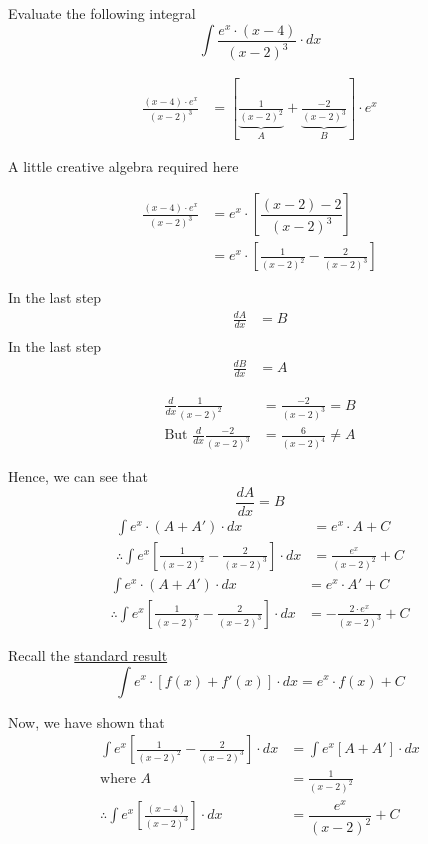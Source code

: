 \documentclass[12pt]{article}
\begin{document}
Evaluate the following integral 
\[ \int \dfrac{e^x\cdot (x-4)}{(x-2)^3}\cdot dx \]

\newcard 

\begin{align}
\frac{(x-4)\cdot e^x}{(x-2)^3} &= \left[\underbrace{\frac{1}{(x-2)^2}}_A+\underbrace{\frac{-2}{(x-2)^3}}_B\right]\cdot e^x 
\end{align}

\newcard 
A little creative algebra required here

\begin{align}
	\frac{(x-4)\cdot e^x}{(x-2)^3} &= e^x\cdot \left[ \dfrac{(x-2) - 2}{(x-2)^3}\right] \\
	&= e^x\cdot \left[ \frac{1}{(x-2)^2} - \frac{2}{(x-2)^3}\right]
\end{align}

\newcard 
In the last step
\begin{align}
	\frac{dA}{dx} &= B \\ 
\end{align}
\newcard 
In the last step 
\begin{align}
	\frac{dB}{dx} &= A 
\end{align}

\newcard 
\begin{align}
	\frac{d}{dx}\frac{1}{(x-2)^2} &= \frac{-2}{(x-2)^3} = B \\ 
	\text{But }\frac{d}{dx} \frac{-2}{(x-2)^3} &= \frac{6}{(x-2)^4} \neq A 
\end{align}

Hence, we can see that \[ \frac{dA}{dx} = B \]
\newcard 
\begin{align}
	\int e^x\cdot \left(A + A' \right)\cdot dx &= e^x\cdot A + C \\ 
	\therefore \int e^x \left[\frac{1}{(x-2)^2}-\frac{2}{(x-2)^3} \right]\cdot dx &= \frac{e^x}{(x-2)^2} + C 
\end{align}
\newcard 
\begin{align}
	\int e^x\cdot \left(A + A' \right)\cdot dx &= e^x\cdot A' + C \\ 
	\therefore \int e^x \left[\frac{1}{(x-2)^2}-\frac{2}{(x-2)^3} \right]\cdot dx &= -\frac{2\cdot e^x}{(x-2)^3} + C 
\end{align}

\newcard 
Recall the \underline{standard result}
\[ \int e^x\cdot \left[f(x) + f'(x) \right]\cdot dx = e^x\cdot f(x) + C\]

Now, we have shown that 
\begin{align}
	\int e^x \left[\frac{1}{(x-2)^2} - \frac{2}{(x-2)^3} \right]\cdot dx &= \int e^x \left[A + A' \right]\cdot dx \\
	\text{where } A &= \frac{1}{(x-2)^2} \\
	\therefore \int e^x \left[\frac{(x-4)}{(x-2)^3} \right]\cdot dx &= \dfrac{e^x}{(x-2)^2} + C 
\end{align}
\end{document}
